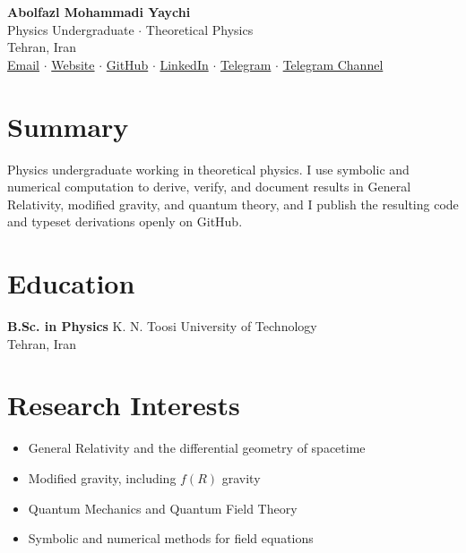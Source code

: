 \documentclass[11pt,a4paper]{article}
\begin{document}
	\begin{center}
		{\Huge \textbf{Abolfazl Mohammadi Yaychi}} \\[0.4em]
		{\large Physics Undergraduate \quad $\cdot$ \quad Theoretical Physics} \\[0.7em]
		Tehran, Iran \\[0.4em]
		\href{mailto:abolfazlqw12@gmail.com}{Email} \quad $\cdot$ \quad
		\href{https://abolfazlmohammadiyaychi.ir}{Website} \quad $\cdot$ \quad
		\href{https://github.com/AbolfazlMohammadi2005}{GitHub} \quad $\cdot$ \quad
		\href{https://www.linkedin.com/in/abolfazl--mohammadi}{LinkedIn} \quad $\cdot$ \quad
		\href{https://t.me/The_PaterAretes}{Telegram} \quad $\cdot$ \quad
		\href{https://t.me/Physicsbymadman}{Telegram Channel}
	\end{center}

	\section{Summary}

	Physics undergraduate working in theoretical physics. I use symbolic and numerical computation to derive, verify, and document results in General Relativity, modified gravity, and quantum theory, and I publish the resulting code and typeset derivations openly on GitHub.

	\section{Education}

	\textbf{B.Sc. in Physics} \hfill K. N. Toosi University of Technology \\
	Tehran, Iran

	\section{Research Interests}

	\begin{itemize}[label=--]
		\item General Relativity and the differential geometry of spacetime
		\item Modified gravity, including $f(R)$ gravity
		\item Quantum Mechanics and Quantum Field Theory
		\item Symbolic and numerical methods for field equations
	\end{itemize}
\end{document}

